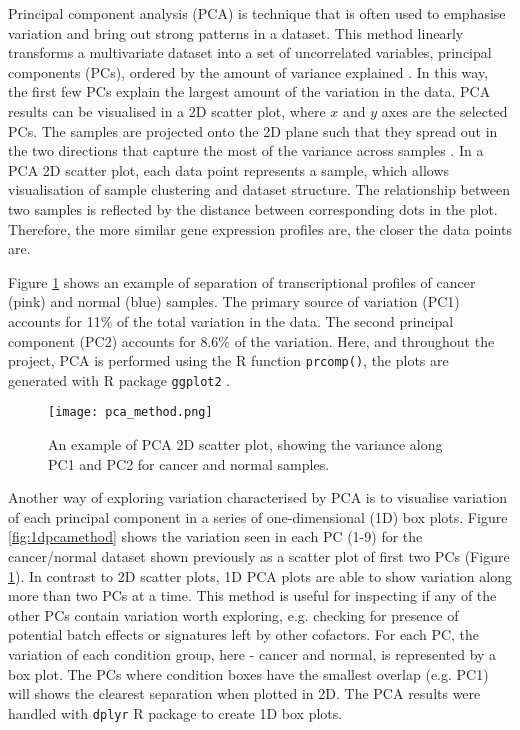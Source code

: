     Principal component analysis (PCA) is technique that is often used to emphasise variation and bring out strong patterns in a dataset. This method linearly transforms a multivariate dataset into a set of uncorrelated variables, principal components (PCs), ordered by the amount of variance explained \cite{jolliffe2002principal}. In this way, the first few PCs explain the largest amount of the variation in the data. PCA results can be visualised in a 2D scatter plot, where $x$ and $y$ axes are the selected PCs. The samples are projected onto the 2D plane such that they spread out in the two directions that capture the most of the variance across samples \cite{Love2016RNA-SeqApproved}. 
    In a PCA 2D scatter plot, each data point represents a sample, which allows visualisation of sample clustering and dataset structure.  The relationship between two samples is reflected by the distance between corresponding dots in the plot. Therefore, the more similar gene expression profiles are, the closer the data points are.    
   
    Figure \ref{fig:pcamethod} shows an example of separation of transcriptional profiles of cancer (pink) and normal (blue) samples. The primary source of variation (PC1) accounts for 11\% of the total variation in the data. The second principal component (PC2) accounts for 8.6\% of the variation. 
    Here, and throughout the project, PCA is performed using the R function \texttt{prcomp()}, the plots are generated with R package \texttt{ggplot2} \cite{ggplot2}.
    
            \begin{figure}[!h]
            \centering
            \texttt{[image: pca\_method.png]}
            \caption{An example of PCA 2D scatter plot, showing the variance along PC1 and PC2 for cancer and normal samples.}
            \label{fig:pcamethod}
            \end{figure}
        
    \newpage
    Another way of exploring variation characterised by PCA is to visualise variation of each principal component in a series of one-dimensional (1D) box plots. Figure \ref{fig:1dpcamethod} shows the variation seen in each PC (1-9) for the cancer/normal dataset shown previously as a scatter plot of first two PCs (Figure \ref{fig:pcamethod}). 
    In contrast to 2D scatter plots, 1D PCA plots are able to show variation along more than two PCs at a time. This method is useful for inspecting if any of the other PCs contain variation worth exploring, e.g. checking for presence of potential batch effects or signatures left by other cofactors. 
    For each PC, the variation of each condition group, here - cancer and normal, is represented by a box plot. The PCs where condition boxes have the smallest overlap (e.g. PC1) will shows the clearest separation when plotted in 2D. The PCA results were handled with \texttt{dplyr} R package \cite{wickham2015dplyr} to create 1D box plots. \\
       
